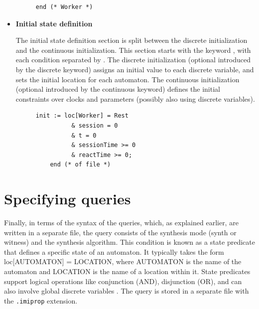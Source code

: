 \begin{itemize}
\begin{figure}[H]
\begin{lstlisting}[language=UPPAAL, caption={Construction of the Automata using Worker Automata as Example}, label={lst:VD_example}]
    end	(* Worker *)
    \end{lstlisting}
    \end{figure}

    

    
    \item \textbf{Initial state definition}

    The initial state definition section is split between the discrete initialization and the continuous initialization. This section starts with the keyword , with each condition separated by \kw{\&}.
    The discrete initialization (optional introduced by the discrete keyword) assigns an initial value to each discrete variable, and sets the initial location for each automaton.
     The continuous initialization (optional introduced by the continuous keyword) defines the initial constraints over clocks and parameters (possibly also using discrete variables).

    \begin{figure}[H]
    \centering
    \begin{lstlisting}[language=UPPAAL, caption={Initial state definition using Worker Automata as Exemple}, label={lst:VD_example}]
    init := loc[Worker] = Rest
          & session = 0
          & t = 0
          & sessionTime >= 0
          & reactTime >= 0;
    end (* of file *)
    \end{lstlisting}
    \end{figure}
    
\end{itemize}

\section{Specifying queries}


Finally, in terms of the syntax of the queries, which, as explained earlier, are written in a separate file, the query consists of the synthesis mode (synth or witness) and the synthesis algorithm. This condition is known as a state predicate that defines a specific state of an automaton. It typically takes the form loc[AUTOMATON] = LOCATION, where AUTOMATON is the name of the automaton and LOCATION is the name of a location within it. State predicates support logical operations like conjunction (AND), disjunction (OR), and can also involve global discrete variables \cite{IMITATOR}. The query is stored in a separate file with the \texttt{.imiprop} extension.

